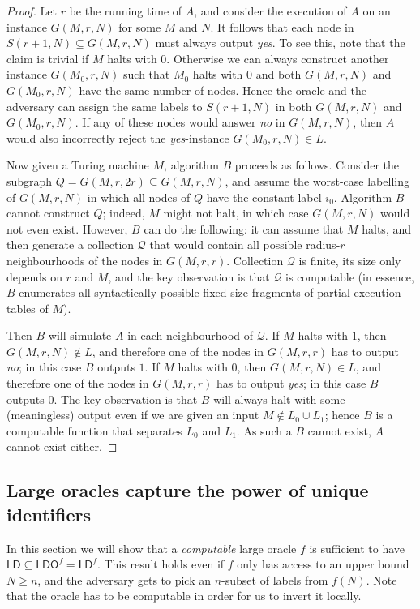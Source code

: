 \documentclass[11pt,a4paper]{article}
\theoremstyle{definition}
\theoremstyle{remark}
\newcommand{\ldo}{\mathsf{LDO}}
\newcommand{\ld}{\mathsf{LD}}
\begin{document}
\begin{proof}
Let $r$ be the running time of $A$, and consider the execution of $A$ on an instance $G(M,r,N)$ for some $M$ and $N$. It follows that each node in $S(r+1,N) \subseteq G(M,r,N)$ must always output \emph{yes}. To see this, note that the claim is trivial if $M$ halts with $0$. Otherwise we can always construct another instance $G(M_0,r,N)$ such that $M_0$ halts with $0$ and both $G(M,r,N)$ and $G(M_0,r,N)$ have the same number of nodes. Hence the oracle and the adversary can assign the same labels to $S(r+1,N)$ in both $G(M,r,N)$ and $G(M_0,r,N)$. If any of these nodes would answer \emph{no} in $G(M,r,N)$, then $A$ would also incorrectly reject the \emph{yes}-instance $G(M_0,r,N) \in L$.

Now given a Turing machine $M$, algorithm $B$ proceeds as follows. Consider the subgraph $Q = G(M,r,2r) \subseteq G(M,r,N)$, and assume the worst-case labelling of $G(M,r,N)$ in which all nodes of $Q$ have the constant label $i_0$. Algorithm $B$ cannot construct $Q$; indeed, $M$ might not halt, in which case $G(M,r,N)$ would not even exist. However, $B$ can do the following: it can assume that $M$ halts, and then generate a collection $\mathcal{Q}$ that would contain all possible radius-$r$ neighbourhoods of the nodes in $G(M,r,r)$. Collection $\mathcal{Q}$ is finite, its size only depends on $r$ and $M$, and the key observation is that $\mathcal{Q}$ is computable (in essence, $B$ enumerates all syntactically possible fixed-size fragments of partial execution tables of $M$).

Then $B$ will simulate $A$ in each neighbourhood of $\mathcal{Q}$. If $M$ halts with $1$, then $G(M,r,N) \notin L$, and therefore one of the nodes in $G(M,r,r)$ has to output \emph{no}; in this case $B$ outputs $1$. If $M$ halts with $0$, then $G(M,r,N) \in L$, and therefore one of the nodes in $G(M,r,r)$ has to output \emph{yes}; in this case $B$ outputs $0$. The key observation is that $B$ will always halt with some (meaningless) output even if we are given an input $M \notin L_0 \cup L_1$; hence $B$ is a computable function that separates $L_0$ and $L_1$. As such a $B$ cannot exist, $A$ cannot exist either. \qedhere
\end{proof}

\subsection{Large oracles capture the power of unique identifiers} \label{ssec:thm-equality}

In this section we will show that a \emph{computable} large oracle $f$ is sufficient to have $\ld \subseteq \ldo^f = \ld^f$. This result holds even if $f$ only has access to an upper bound $N \ge n$, and the adversary gets to pick an $n$-subset of labels from $f(N)$. Note that the oracle has to be computable in order for us to invert it locally.
\end{document}
